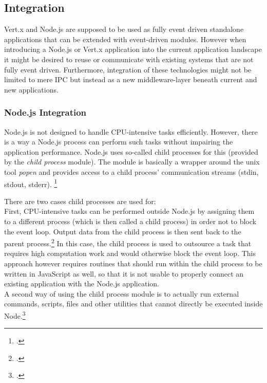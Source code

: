 \subsection{Integration}
\label{integration}
Vert.x and Node.js are supposed to be used as fully event driven standalone
applications that can be extended with event-driven modules.
However when introducing a Node.js or Vert.x application into the current
application landscape it might be desired to reuse or communicate with existing
systems that are not fully event driven. Furthermore, integration of these
technologies might not be limited to mere IPC but instead as a new middleware-layer beneath current and new
applications.\\

\subsubsection{Node.js Integration}
\label{node_integration}
Node.js is not designed to handle CPU-intensive tasks efficiently. However,
there is a way a Node.js process can perform such tasks without impairing the
application performance. Node.js uses so-called child processes for this
(provided by the \textit{child process}
module). The module is basically a wrapper around the unix tool \textit{popen} and
provides access to a child process' communication streams (stdin, stdout, stderr).
\footcite[Cf.][]{node_child_process}

There are two cases child processes are used for:\\
First, CPU-intensive tasks can be performed outside Node.js by assigning them to a
different process (which is then called a child process) in order not to block
the event loop. Output data from the child process is then sent back to the
parent process.\footcite[Cf.][63]{teixeira_2012} In this case, the child process is used to
outsource a task that requires high computation work and would otherwise block
the event loop. This approach however requires routines that should run
within the child process to be written in JavaScript as well, so that it is not
usable to properly connect an existing application with the Node.js application.\\
A second way of using the child process module is to actually run external
commands, scripts, files and other utilities that cannot directly be executed inside Node.\footcite[Cf.][63]{teixeira_2012}

